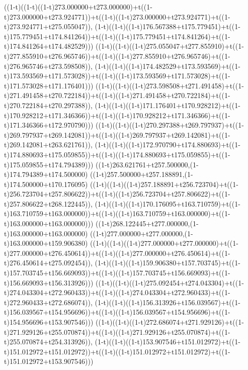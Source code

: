 ((1-t)((1-t)((1-t)273.000000+t273.000000)+t((1-t)273.000000+t273.924771))+t((1-t)((1-t)273.000000+t273.924771)+t((1-t)273.924771+t275.055047)),                                     (1-t)((1-t)((1-t)176.567388+t175.779451)+t((1-t)175.779451+t174.841264))+t((1-t)((1-t)175.779451+t174.841264)+t((1-t)174.841264+t174.482529)))
((1-t)((1-t)((1-t)275.055047+t277.855910)+t((1-t)277.855910+t276.965746))+t((1-t)((1-t)277.855910+t276.965746)+t((1-t)276.965746+t273.598508)),                                     (1-t)((1-t)((1-t)174.482529+t173.593569)+t((1-t)173.593569+t171.573028))+t((1-t)((1-t)173.593569+t171.573028)+t((1-t)171.573028+t171.176401)))
((1-t)((1-t)((1-t)273.598508+t271.491458)+t((1-t)271.491458+t270.722184))+t((1-t)((1-t)271.491458+t270.722184)+t((1-t)270.722184+t270.297388)),                                     (1-t)((1-t)((1-t)171.176401+t170.928212)+t((1-t)170.928212+t171.346366))+t((1-t)((1-t)170.928212+t171.346366)+t((1-t)171.346366+t172.970790)))
((1-t)((1-t)((1-t)270.297388+t269.797937)+t((1-t)269.797937+t269.142081))+t((1-t)((1-t)269.797937+t269.142081)+t((1-t)269.142081+t263.621761)),                                     (1-t)((1-t)((1-t)172.970790+t174.880693)+t((1-t)174.880693+t175.059855))+t((1-t)((1-t)174.880693+t175.059855)+t((1-t)175.059855+t174.794389)))
((1-t)263.621761+t257.500000,(1-t)174.794389+t174.500000)
((1-t)257.500000+t257.188891,(1-t)174.500000+t170.176095)
((1-t)((1-t)((1-t)257.188891+t256.723704)+t((1-t)256.723704+t257.806622))+t((1-t)((1-t)256.723704+t257.806622)+t((1-t)257.806622+t268.122445)),                                     (1-t)((1-t)((1-t)170.176095+t163.710759)+t((1-t)163.710759+t163.000000))+t((1-t)((1-t)163.710759+t163.000000)+t((1-t)163.000000+t163.000000)))
((1-t)268.122445+t277.000000,(1-t)163.000000+t163.000000)
((1-t)277.000000+t277.000000,(1-t)163.000000+t159.906380)
((1-t)((1-t)((1-t)277.000000+t277.000000)+t((1-t)277.000000+t276.450614))+t((1-t)((1-t)277.000000+t276.450614)+t((1-t)276.450614+t275.092454)),                                     (1-t)((1-t)((1-t)159.906380+t157.703745)+t((1-t)157.703745+t156.669093))+t((1-t)((1-t)157.703745+t156.669093)+t((1-t)156.669093+t156.313926)))
((1-t)((1-t)((1-t)275.092454+t274.043304)+t((1-t)274.043304+t272.960433))+t((1-t)((1-t)274.043304+t272.960433)+t((1-t)272.960433+t272.686074)),                                     (1-t)((1-t)((1-t)156.313926+t156.039567)+t((1-t)156.039567+t154.956696))+t((1-t)((1-t)156.039567+t154.956696)+t((1-t)154.956696+t153.907546)))
((1-t)((1-t)((1-t)272.686074+t271.929126)+t((1-t)271.929126+t255.070874))+t((1-t)((1-t)271.929126+t255.070874)+t((1-t)255.070874+t254.313926)),                                     (1-t)((1-t)((1-t)153.907546+t151.012972)+t((1-t)151.012972+t151.012972))+t((1-t)((1-t)151.012972+t151.012972)+t((1-t)151.012972+t153.907546)))
